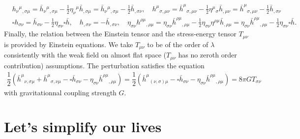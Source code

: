 \documentclass[10pt, a4paper]{article}
\begin{document}
{\begin{align*}
  &h_{\nu}{}^{\mu}{}_{, \sigma \mu} = \bar{h}_{\nu}{}^{\mu}{}_{, \sigma \mu} - \frac{1}{2} \eta_{\nu}{}^{\mu} \bar{h}_{, \sigma \mu} = \bar{h}_{\nu}{}^{\mu}{}_{, \sigma \mu}- \frac{1}{2} \bar{h}_{, \sigma \nu}, \quad h^\mu{}_{\sigma, \mu \nu} = \bar{h}^\mu{}_{\sigma, \mu \nu} - \frac{1}{2}\eta^\mu{}_{\sigma} \bar{h}_{, \mu \nu} = \bar{h}^\mu{}_{\sigma, \mu \nu} - \frac{1}{2}\bar{h}_{, \sigma \nu}\\
  &\square h_{\sigma\nu} = \bar{h}_{\sigma\nu} - \frac{1}{2}\eta_{\sigma\nu} \square \bar{h}, \quad h_{, \sigma \nu} = -\bar{h}_{, \sigma \nu}, \quad \eta_{\sigma\nu} h^{\rho\mu}{}_{, \rho \mu} = \eta_{\sigma\nu}\bar{h}^{\rho\mu}{}_{, \rho \mu} - \frac{1}{2}\eta_{\sigma\nu}\eta^{\rho\mu} \bar{h}_{, \rho \mu} = \eta_{\sigma\nu}\bar{h}^{\rho\mu}{}_{, \rho \mu} - \frac{1}{2}\eta_{\sigma\nu} \square\bar{h}.
\end{align*}
Finally, the relation between the Einstein tensor and the stress-energy tensor $T_{\mu\nu}$ is provided by Einstein equations. We take $T_{\mu\nu}$ to be of the order of $\lambda$ consistently with the weak field on almost flat space ($T_{\mu\nu}$ has no zeroth order contribution) assumptions. The perturbation satisfies the equation 
\begin{align*}
  \dfrac{1}{2}(\bar{h}^{\mu}{}_{\nu, \sigma \mu}+ \bar{h}^\mu{}_{\sigma, \nu \mu} -\square\bar{h}_{\sigma\nu} -\eta_{\sigma\nu}\bar{h}^{\rho\mu}{}_{, \rho \mu}) = \dfrac{1}{2}( \bar{h}^\mu{}_{(\nu, \sigma) \mu} -\square\bar{h}_{\sigma\nu} -\eta_{\sigma\nu}\bar{h}^{\rho\mu}{}_{, \rho \mu}) = 8\pi G T_{\sigma \nu}
\end{align*}
with gravitationnal coupling strength $G$.
}


\section{Let’s simplify our lives}
\end{document}
